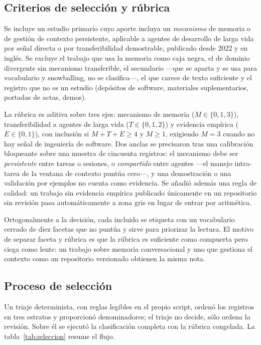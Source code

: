 \documentclass[conference]{IEEEtran}
\begin{document}
\subsection{Criterios de selección y rúbrica}
\label{sec:criteria}

Se incluye un estudio primario cuyo aporte incluya un \emph{mecanismo} de memoria o de gestión de
contexto persistente, aplicable a agentes de desarrollo de larga vida por señal directa o por
transferibilidad demostrable, publicado desde 2022 y en inglés. Se excluye el trabajo que usa la
memoria como caja negra, el de dominio divergente sin mecanismo transferible, el secundario —que se
aparta y se usa para vocabulario y snowballing, no se clasifica—, el que carece de texto suficiente y
el registro que no es un estudio (depósitos de software, materiales suplementarios, portadas de
actas, demos).

La rúbrica es aditiva sobre tres ejes: mecanismo de memoria ($M \in \{0,1,3\}$), transferibilidad a
agentes de larga vida ($T \in \{0,1,2\}$) y evidencia empírica ($E \in \{0,1\}$), con inclusión si
$M+T+E \geq 4$ y $M \geq 1$, exigiendo $M = 3$ cuando no hay señal de ingeniería de software. Dos
anclas se precisaron tras una calibración bloqueante sobre una muestra de cincuenta registros: el
mecanismo debe ser \emph{persistente} entre tareas o sesiones, o \emph{compartido} entre agentes
—el manejo intra-tarea de la ventana de contexto puntúa cero—, y una demostración o una validación
por ejemplos no cuenta como evidencia. Se añadió además una regla de calidad: un trabajo sin
evidencia empírica publicado únicamente en un repositorio sin revisión pasa automáticamente a zona
gris en lugar de entrar por aritmética.

Ortogonalmente a la decisión, cada incluido se etiqueta con un vocabulario cerrado de diez facetas
que no puntúa y sirve para priorizar la lectura. El motivo de separar faceta y rúbrica es que la
rúbrica es suficiente como compuerta pero ciega como lente: un trabajo sobre memoria conversacional
y uno que gestiona el contexto como un repositorio versionado obtienen la misma nota.

\subsection{Proceso de selección}
\label{sec:selection}

Un triaje determinista, con reglas legibles en el propio script, ordenó los registros en tres
estratos y proporcionó denominadores; el triaje no decide, sólo ordena la revisión. Sobre él se
ejecutó la clasificación completa con la rúbrica congelada. La tabla~\ref{tab:seleccion} resume el
flujo.
\end{document}
